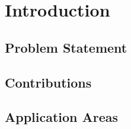 
\chapter{Introduction}


\section{Problem Statement}



\section{Contributions}



\section{Application Areas}


\cleardoublepage
